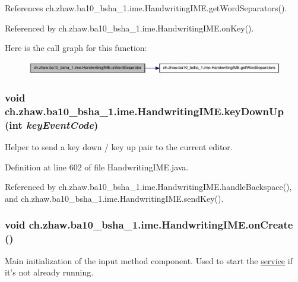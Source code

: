 References ch.zhaw.ba10\_\-bsha\_\-1.ime.HandwritingIME.getWordSeparators().

Referenced by ch.zhaw.ba10\_\-bsha\_\-1.ime.HandwritingIME.onKey().

Here is the call graph for this function:\nopagebreak
\begin{figure}[H]
\begin{center}
\leavevmode
\includegraphics[width=323pt]{classch_1_1zhaw_1_1ba10__bsha__1_1_1ime_1_1HandwritingIME_aeef9b5d4fa9f314d5bf17331645ba93b_cgraph}
\end{center}
\end{figure}
\hypertarget{classch_1_1zhaw_1_1ba10__bsha__1_1_1ime_1_1HandwritingIME_acaadb74527ea7fc306cdd571b9a25097}{
\subsubsection[{keyDownUp}]{\setlength{\rightskip}{0pt plus 5cm}void ch.zhaw.ba10\_\-bsha\_\-1.ime.HandwritingIME.keyDownUp (int {\em keyEventCode})}}
\label{classch_1_1zhaw_1_1ba10__bsha__1_1_1ime_1_1HandwritingIME_acaadb74527ea7fc306cdd571b9a25097}
Helper to send a key down / key up pair to the current editor. 

Definition at line 602 of file HandwritingIME.java.

Referenced by ch.zhaw.ba10\_\-bsha\_\-1.ime.HandwritingIME.handleBackspace(), and ch.zhaw.ba10\_\-bsha\_\-1.ime.HandwritingIME.sendKey().\hypertarget{classch_1_1zhaw_1_1ba10__bsha__1_1_1ime_1_1HandwritingIME_a391f1eb148d1c08e456d1595516c158c}{
\subsubsection[{onCreate}]{\setlength{\rightskip}{0pt plus 5cm}void ch.zhaw.ba10\_\-bsha\_\-1.ime.HandwritingIME.onCreate ()}}
\label{classch_1_1zhaw_1_1ba10__bsha__1_1_1ime_1_1HandwritingIME_a391f1eb148d1c08e456d1595516c158c}
Main initialization of the input method component. Used to start the \hyperlink{namespacech_1_1zhaw_1_1ba10__bsha__1_1_1service}{service} if it's not already running. 

